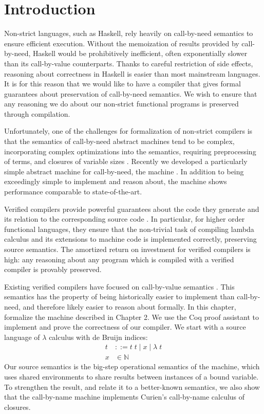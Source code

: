 \section{Introduction} \label{sec:introduction}
Non-strict languages, such as Haskell, rely heavily on call-by-need semantics to
ensure efficient execution. Without the memoization of results provided by
call-by-need, Haskell would be prohibitively inefficient, often exponentially
slower than its call-by-value counterparts. Thanks to careful restriction of
side effects, reasoning about correctness in Haskell is easier than most mainstream
languages. It is for this reason that we would like to have a compiler that
gives formal guarantees about preservation of call-by-need semantics. We wish to
ensure that any reasoning we do about our non-strict functional programs is
preserved through compilation.

Unfortunately, one of the challenges for formalization of non-strict compilers
is that the semantics of call-by-need abstract machines tend to be complex,
incorporating complex optimizations into the semantics, requiring preprocessing
of terms, and closures of variable sizes \cite{jonesstg, TIM}. Recently we
developed a particularly simple abstract machine for call-by-need, the
\ce machine \cite{cem}. In addition to being exceedingly simple to
implement and reason about, the machine shows performance comparable to
state-of-the-art.

Verified compilers provide powerful guarantees about the code they generate and
its relation to the corresponding source code \cite{chlipala2007certified,
leroy2012compcert, cakeml14}.  In particular, for higher order functional
languages, they ensure that the non-trivial task of compiling lambda
calculus and its extensions to machine code is implemented correctly,
preserving source semantics. The amortized return on investment for verified
compilers is high: any reasoning about any program which is compiled with a
verified compiler is provably preserved. 

Existing verified compilers have focused on call-by-value semantics
\cite{chlipala2007certified, leroy2012compcert, cakeml14}. This semantics has
the property of being historically easier to implement than call-by-need, and
therefore likely easier to reason about formally. In this chapter, formalize the
\ce machine described in Chapter 2. We use the Coq proof assistant
\cite{barras1997coq} to implement and prove the correctness of our compiler. We
start with a source language of $\lambda$ calculus with de Bruijn indices:
\begin{align*}
 t &::= t \; t \; | \; x \; | \;  \lambda \; t \\
 x &\in \mathbb{N}
\end{align*}
Our source semantics is the big-step operational semantics of the \ce 
machine, which uses shared environments to share results between instances of a
bound variable. To strengthen the result, and relate it to a better-known
semantics, we also show that the call-by-name \ce machine implements
Curien's call-by-name calculus of closures. 


